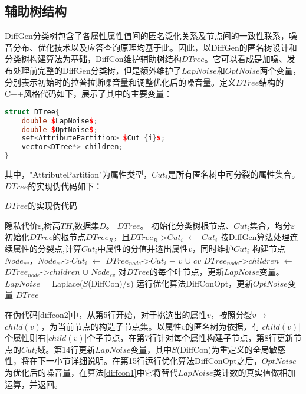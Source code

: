 \subsection{辅助树结构}

DiffGen分类树包含了各属性属性值间的匿名泛化关系及节点间的一致性联系，噪音分布、优化技术以及应答查询原理均基于此。因此，以DiffGen的匿名树设计和分类树构建算法为基础，DiffCon维护辅助树结构$DTree$。它可以看成是加噪、发布处理前完整的DiffGen分类树，但是额外维护了$LapNoise$和$OptNoise$两个变量，分别表示初始时的拉普拉斯噪音量和调整优化后的噪音量。定义$DTree$结构的C++风格代码如下，展示了其中的主要变量：

\begin{lstlisting}[language={C++}, caption={DTree结构关键代码}]
struct DTree{
	double $LapNoise$;
	double $OptNoise$;
	set<AttributePartition> $Cut_{i}$;
	vector<DTree*> children;
}
\end{lstlisting}
其中，"AttributePartition"为属性类型，$Cut_{i}$是所有匿名树中可分裂的属性集合。$DTree$的实现伪代码如下：

\begin{algorithm}
	\caption{$DTree$的实现伪代码} 
	\label{diffcon2}
	\begin{algorithmic}[1]
		\REQUIRE 隐私代价$\varepsilon$,树高$TH$,数据集$D$。
		\ENSURE $DTree$。
		\STATE 初始化分类树根节点、$Cut_{i}$集合，均分$\varepsilon$
		\STATE 初始化$DTree$的根节点$DTree_{R}$，且$DTree_{R}$->$Cut_{i}$ $\leftarrow$ $Cut_{i}$
		\STATE 按DiffGen算法处理连续属性的分裂点,计算$Cut_{i}$中属性的分值并选出属性$v$，同时维护$Cut_{i}$
		\STATE 构建节点$Node_{cv}$，$Node_{cv}$->$Cut_{i}$ $\leftarrow$ $DTree_{node}$->$Cut_{i}$ $ - $ $v$ $\cup$ $cv$
		\STATE $DTree_{node}$->$children$ $\leftarrow$ $DTree_{node}$->$children$ $\cup$ $Node_{cv}$
		\ENDFOR
		\ENDIF 
		\ENDFOR
		\ENDFOR
		\STATE 对$DTree$的每个叶节点，更新$LapNoise$变量。$LapNoise$ = Laplace($S$(DiffCon)/$\varepsilon$)
		\STATE 运行优化算法DiffConOpt，更新$OptNoise$变量
		\RETURN $DTree$
	\end{algorithmic}
\end{algorithm} 

在伪代码\ref{diffcon2}中，从第5行开始，对于挑选出的属性$v$，按照分裂$v$$\rightarrow$$child(v)$，为当前节点的构造子节点集。以属性$v$的匿名树为依据，有|$child(v)$|个属性则有|$child(v)$|个子节点，在第7行针对每个属性构建子节点，第8行更新节点的$Cut_{i}$域。第14行更新$LapNoise$变量，其中$S$(DiffCon)为重定义的全局敏感性，将在下一小节详细说明。在第15行运行优化算法DiffConOpt之后，$OptNoise$为优化后的噪音量，在算法\ref{diffcon1}中它将替代$LapNoise$类计数的真实值做相加运算，并返回。

